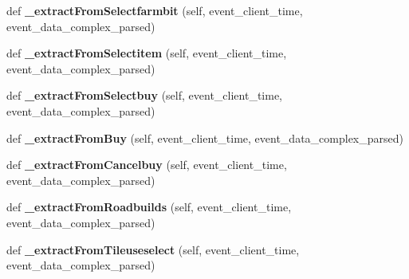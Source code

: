 \begin{DoxyCompactItemize}
def {\bfseries \+\_\+extract\+From\+Selectfarmbit} (self, event\+\_\+client\+\_\+time, event\+\_\+data\+\_\+complex\+\_\+parsed)
\item 
\mbox{\label{classfeature__extractors_1_1_lakeland_extractor_1_1_lakeland_extractor_ab71734879f626e1bca4383d2fae3c2ed}} 
def {\bfseries \+\_\+extract\+From\+Selectitem} (self, event\+\_\+client\+\_\+time, event\+\_\+data\+\_\+complex\+\_\+parsed)
\item 
\mbox{\label{classfeature__extractors_1_1_lakeland_extractor_1_1_lakeland_extractor_a1d4cf4969c4ad43bb397b5555fad82ad}} 
def {\bfseries \+\_\+extract\+From\+Selectbuy} (self, event\+\_\+client\+\_\+time, event\+\_\+data\+\_\+complex\+\_\+parsed)
\item 
\mbox{\label{classfeature__extractors_1_1_lakeland_extractor_1_1_lakeland_extractor_aebf3ea9436dbbe1892396bf04f77ffe3}} 
def {\bfseries \+\_\+extract\+From\+Buy} (self, event\+\_\+client\+\_\+time, event\+\_\+data\+\_\+complex\+\_\+parsed)
\item 
\mbox{\label{classfeature__extractors_1_1_lakeland_extractor_1_1_lakeland_extractor_a31d6458415badca7ebcedc082ed69db3}} 
def {\bfseries \+\_\+extract\+From\+Cancelbuy} (self, event\+\_\+client\+\_\+time, event\+\_\+data\+\_\+complex\+\_\+parsed)
\item 
\mbox{\label{classfeature__extractors_1_1_lakeland_extractor_1_1_lakeland_extractor_afff38abbca92157db4b40a2a811dd85e}} 
def {\bfseries \+\_\+extract\+From\+Roadbuilds} (self, event\+\_\+client\+\_\+time, event\+\_\+data\+\_\+complex\+\_\+parsed)
\item 
\mbox{\label{classfeature__extractors_1_1_lakeland_extractor_1_1_lakeland_extractor_a5d331f3434ef0f247c917f186cf555cf}} 
def {\bfseries \+\_\+extract\+From\+Tileuseselect} (self, event\+\_\+client\+\_\+time, event\+\_\+data\+\_\+complex\+\_\+parsed)
\item 

\end{DoxyCompactItemize}
